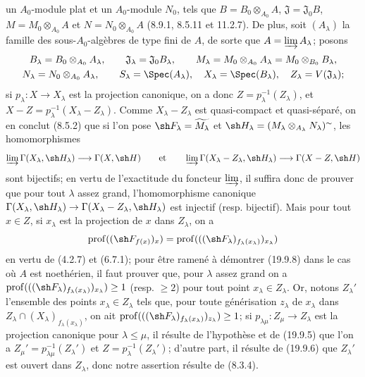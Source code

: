 un $A_0$-module plat et un $A_0$-module $N_0$, tels que $B=B_0\otimes_{A_0}A$, $\mathfrak J=\mathfrak J_0B$, $M=M_0\otimes_{A_0}A$ et $N=N_0\otimes_{A_0}A$ (8.9.1, 8.5.11 et 11.2.7). De plus, soit $(A_\lambda)$ la famille des sous-$A_0$-algèbres de type fini de $A$, de sorte que $A=\varinjlim A_\lambda$; posons
\[
\begin{gathered}
  B_\lambda=B_0\otimes_{A_0}A_\lambda,\qquad
  \mathfrak J_\lambda=\mathfrak J_0B_\lambda,\qquad
  M_\lambda=M_0\otimes_{A_0}A_\lambda=M_0\otimes_{B_0}B_\lambda,\\
  N_\lambda=N_0\otimes_{A_0}A_\lambda,\qquad
  S_\lambda=\Spec(A_\lambda),\quad
  X_\lambda=\Spec(B_\lambda),\quad
  Z_\lambda=V(\mathfrak J_\lambda);
\end{gathered}
\]
si $p_\lambda:X\to X_\lambda$ est la projection canonique, on a donc $Z=p_\lambda^{-1}(Z_\lambda)$, et $X-Z=p_\lambda^{-1}(X_\lambda-Z_\lambda)$. Comme $X_\lambda-Z_\lambda$ est quasi-compact et quasi-séparé, on en conclut (8.5.2) que si l'on pose $\sh F_\lambda=\widetilde{M_\lambda}$ et $\sh H_\lambda=(M_\lambda\otimes_{A_\lambda}N_\lambda)^\sim$, les homomorphismes
\[
  \varinjlim\Gamma(X_\lambda,\sh H_\lambda)\longrightarrow\Gamma(X,\sh H)
  \qquad\text{et}\qquad
  \varinjlim\Gamma(X_\lambda-Z_\lambda,\sh H_\lambda)\longrightarrow\Gamma(X-Z,\sh H)
\]
sont bijectifs; en vertu de l'exactitude du foncteur $\varinjlim$, il suffira donc de prouver que pour tout $\lambda$ assez grand, l'homomorphisme canonique $\Gamma(X_\lambda,\sh H_\lambda)\to\Gamma(X_\lambda-Z_\lambda,\sh H_\lambda)$ est injectif (resp. bijectif). Mais pour tout $x\in Z$, si $x_\lambda$ est la projection de $x$ dans $Z_\lambda$, on a
\[
  \operatorname{prof}((\sh F_{f(x)})_x)
  =\operatorname{prof}(((\sh F_\lambda)_{f_\lambda(x_\lambda)})_{x_\lambda})
\]
en vertu de (4.2.7) et (6.7.1); pour être ramené à démontrer (19.9.8) dans le cas où $A$ est noethérien, il faut prouver que, pour $\lambda$ assez grand on a $\operatorname{prof}(((\sh F_\lambda)_{f_\lambda(x_\lambda)})_{x_\lambda})\geq1$ (resp. $\geq2$) pour tout point $x_\lambda\in Z_\lambda$. Or, notons $Z_\lambda'$ l'ensemble des points $x_\lambda\in Z_\lambda$ tels que, pour toute générisation $z_\lambda$ de $x_\lambda$ dans $Z_\lambda\cap(X_\lambda)_{f_\lambda(x_\lambda)}$, on ait $\operatorname{prof}(((\sh F_\lambda)_{f_\lambda(x_\lambda)})_{z_\lambda})\geq1$; si $p_{\lambda\mu}:Z_\mu\to Z_\lambda$ est la projection canonique pour $\lambda\leq\mu$, il résulte de l'hypothèse et de (19.9.5) que l'on a $Z_\mu'=p_{\lambda\mu}^{-1}(Z_\lambda')$ et $Z=p_\lambda^{-1}(Z_\lambda')$; d'autre part, il résulte de (19.9.6) que $Z_\lambda'$ est ouvert dans $Z_\lambda$, donc notre assertion résulte de (8.3.4).

